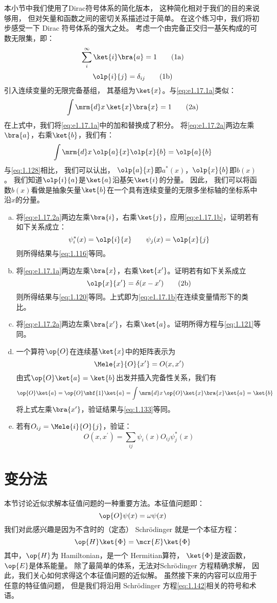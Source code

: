 { 本小节中我们使用了Dirac符号体系的简化版本，
 这种简化相对于我们的目的来说够用，
 但对矢量和函数之间的密切关系描述过于简单。
 在这个练习中，我们将初步感受一下 Dirac 符号体系的强大之处。
 考虑一个由完备正交归一基矢构成的可数无限集，即：
\[
     \sum_i^\infty \ket{i}\bra{a} = 1
     \tag{1a}\label{eq:e1.17.1a}
\]
\[
     \olp{i}{j} = \delta_{ij}
     \tag{1b}\label{eq:e1.17.1b}
\]
引入连续变量的无限完备基组，
其基组为$\ket{x}$。与\autoref{eq:e1.17.1a}类似：
\[
\int\mrm{d}x\,\ket{x}\bra{x} = 1
\tag{2a}\label{eq:e1.17.2a}
\]
在上式中，我们将\autoref{eq:e1.17.1a}中的加和替换成了积分。
将\autoref{eq:e1.17.2a}两边左乘$\bra{a}$，右乘$\ket{b}$，我们有：
\[
\int\mrm{d}x\, \olp{a}{x}\olp{x}{b} = \olp{a}{b}
\]
与\autoref{eq:1.128}相比，
我们可以认出，
$\olp{a}{x}$即$a^\ast(x)$，$\olp{x}{b}$即$b(x)$。
我们知道$\olp{i}{a}$是$\ket{a}$沿基矢$\ket{i}$的分量。
因此，
我们可以将函数$b(x)$看做是抽象矢量$\ket{b}$在一个具有连续变量的无限多坐标轴的坐标系中沿$x$的分量。
\begin{enumerate}[a.]
 \item 将\autoref{eq:e1.17.2a}两边左乘$\bra{i}$，右乘$\ket{j}$，应用\autoref{eq:e1.17.1b}，证明若有如下关系成立：
 \[
 \psi^\ast_i(x) = \olp{i}{x} \qquad \psi_j(x) = \olp{x}{j}
 \]
 则所得结果与\autoref{eq:1.116}等同。
 \item 将\autoref{eq:e1.17.1a}两边左乘$\bra{x}$，右乘$\ket{x^\prime}$。证明若有如下关系成立
 \[
 \olp{x}{x^\prime} = \delta(x - x^\prime)
 \tag{2b} \label{eq:e1.17.2b}
 \]
 则所得结果与\autoref{eq:1.120}等同。上式即为\autoref{eq:e1.17.1b}在连续变量情形下的类比。
 \item 将\autoref{eq:e1.17.2a}两边左乘$\bra{x^\prime}$，右乘$\ket{a}$。证明所得方程与\autoref{eq:1.121}等同。
 \item 一个算符$\op{O}$在连续基$\ket{x}$中的矩阵表示为
 \[\Mele{x}{O}{x^\prime} = O(x, x^\prime)\]
 由式$\op{O}\ket{a} = \ket{b}$出发并插入完备性关系，我们有
 \[\op{O}\ket{a} = \op{O}\mbf{1}\ket{a} = \int\mrm{d}x\,\op{O}\ket{x}\bra{x}\ket{a} = \ket{b}\]
 将上式左乘$\bra{x^\prime}$，验证结果与\autoref{eq:1.133}等同。
 \item 若有$O_{ij} = \Mele{i}{O}{j}$，验证：
 \[O(x,x^\prime) = \sum_{ij}\psi_i(x)O_{ij}\psi_j^\ast(x)\]
\end{enumerate}
}


\section{变分法}
\label{sec:1.3}
本节讨论近似求解本征值问题的一种重要方法。本征值问题即：
\begin{equation}
 \op{O}\psi(x) =\omega\psi(x)
 \label{eq:1.141}
\end{equation}
我们对此感兴趣是因为不含时的（定态） Schr\"{o}dinger 就是一个本征方程：
\begin{equation}
 \op{H} \ket{\Phi} = \mcr{E} \ket{\Phi}
 \label{eq:1.142}
\end{equation}
其中，$\op{H}$为 Hamiltonian，是一个 Hermitian算符，
$\ket{\Phi}$是波函数，$\op{E}$是体系能量。
除了最简单的体系，无法对Schr\"odinger 方程精确求解，
因此，我们关心如何求得这个本征值问题的近似解。
虽然接下来的内容可以应用于任意的特征值问题，
但是我们将沿用 Schr\"odinger 方程\autoref{eq:1.142}相关的符号和术语。

